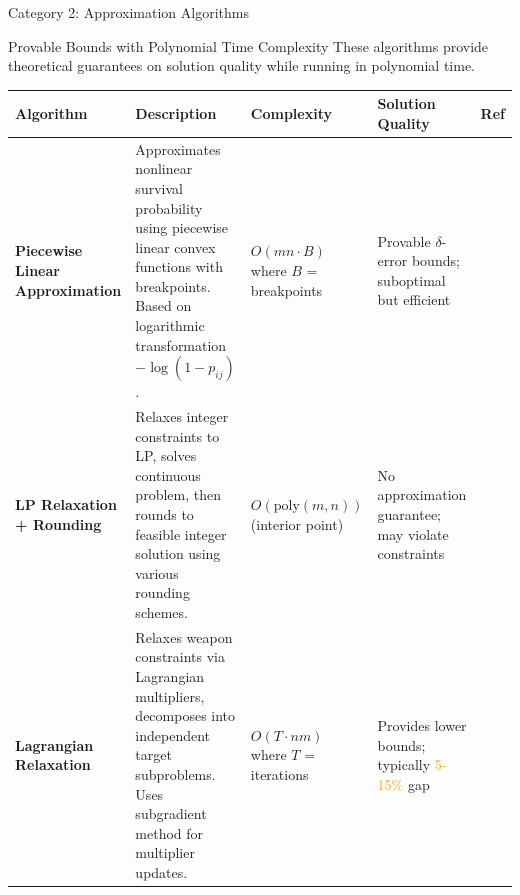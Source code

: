 \documentclass[aspectratio=43,8pt]{beamer}
\begin{document}
\begin{frame}{Category 2: Approximation Algorithms}
\begin{block}{Provable Bounds with Polynomial Time Complexity}
These algorithms provide theoretical guarantees on solution quality while running in polynomial time.
\end{block}

\vspace{0.2cm}
\begin{table}[h]
\centering
\small
\begin{tabular}{p{1.8cm}p{3.6cm}p{1.6cm}p{1.7cm}p{0.8cm}}
\toprule
\textbf{Algorithm} & \textbf{Description} & \textbf{Complexity} & \textbf{Solution Quality} & \textbf{Ref} \\
\midrule
\textbf{Piecewise Linear Approximation} & Approximates nonlinear survival probability using piecewise linear convex functions with breakpoints. Based on logarithmic transformation $-\log(1-p_{ij})$. & $O(mn \cdot B)$ where $B$ = breakpoints & Provable $\delta$-error bounds; suboptimal but efficient & \cite{camm2002,andersen2022} \\
\addlinespace
\textbf{LP Relaxation + Rounding} & Relaxes integer constraints to LP, solves continuous problem, then rounds to feasible integer solution using various rounding schemes. & $O(\text{poly}(m,n))$ (interior point) & No approximation guarantee; may violate constraints & \cite{ahuja2007} \\
\addlinespace
\textbf{Lagrangian Relaxation} & Relaxes weapon constraints via Lagrangian multipliers, decomposes into independent target subproblems. Uses subgradient method for multiplier updates. & $O(T \cdot nm)$ where $T$ = iterations & Provides lower bounds; typically \textcolor{orange}{5-15\%} gap & \cite{kwon1999,kim2022} \\
\bottomrule
\end{tabular}
\end{table}

\end{frame}
\end{document}
